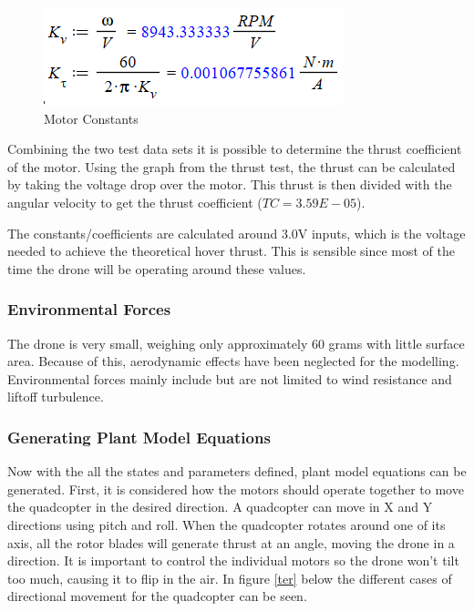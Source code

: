 \begin{figure}[H]
\begin{center}
   \includegraphics[scale =1.5]{pictures/control/Motor constants calc.png}
\end{center}
\caption{Motor Constants}
\label{motorconstantscals}
\end{figure}

Combining the two test data sets it is possible to determine the thrust coefficient of the motor. Using the graph from the thrust test, the thrust can be calculated by taking the voltage drop over the motor. This thrust is then divided with the angular velocity to get the thrust coefficient ($TC=3.59E-05$).

The constants/coefficients are calculated around 3.0V inputs, which is the voltage needed to achieve the theoretical hover thrust. This is sensible since most of the time the drone will be operating around these values. 

\subsubsection{Environmental Forces}
The drone is very small, weighing only approximately 60 grams with little surface area. Because of this, aerodynamic effects have been neglected for the modelling. Environmental forces mainly include but are not limited to wind resistance and liftoff turbulence.

\subsubsection{Generating Plant Model Equations}
Now with the all the states and parameters defined, plant model equations can be generated. 
First, it is considered how the motors should operate together to move the quadcopter in the desired direction. A quadcopter can move in X and Y directions using pitch and roll. When the quadcopter rotates around one of its axis, all the rotor blades will generate thrust at an angle, moving the drone in a direction. It is important to control the individual motors so the drone won’t tilt too much, causing it to flip in the air. In figure \ref{ter} below the different cases of directional movement for the quadcopter can be seen.  


